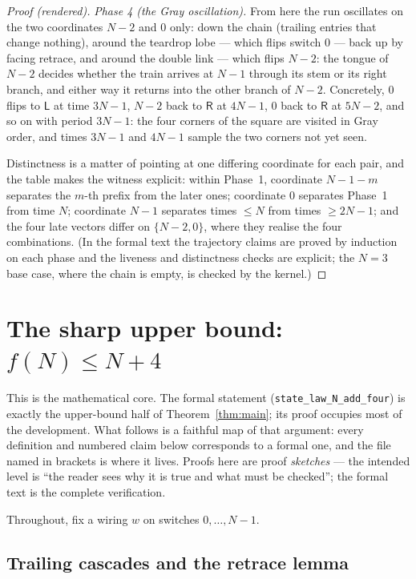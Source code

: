 \documentclass[11pt]{article}
\theoremstyle{definition}
\newcommand{\lean}[1]{\texttt{#1}}
\newcommand{\Left}{\mathsf{L}}
\newcommand{\Right}{\mathsf{R}}
\begin{document}
\begin{proof}[Proof (rendered)]
  \emph{Phase 4 (the Gray oscillation).}  From here the run oscillates
  on the two coordinates $N-2$ and $0$ only: down the chain (trailing
  entries that change nothing), around the teardrop lobe --- which
  flips switch $0$ --- back up by facing retrace, and around the double
  link --- which flips $N-2$: the tongue of $N-2$ decides whether the
  train arrives at $N-1$ through its stem or its right branch, and
  either way it returns into the other branch of $N-2$.  Concretely,
  $0$ flips to $\Left$ at time $3N-1$, $N-2$ back to $\Right$ at $4N-1$,
  $0$ back to $\Right$ at $5N-2$, and so on with period $3N-1$: the four
  corners of the square are visited in Gray order, and times $3N-1$ and
  $4N-1$ sample the two corners not yet seen.

  Distinctness is a matter of pointing at one differing coordinate for
  each pair, and the table makes the witness explicit: within Phase~1,
  coordinate $N-1-m$ separates the $m$-th prefix from the later ones;
  coordinate $0$ separates Phase~1 from time $N$; coordinate $N-1$
  separates times $\le N$ from times $\ge 2N-1$; and the four late
  vectors differ on $\{N-2, 0\}$, where they realise the four
  combinations.  (In the formal text the trajectory claims are proved by
  induction on each phase and the liveness and distinctness checks are
  explicit; the $N = 3$ base case, where the chain is empty, is checked
  by the kernel.)
\end{proof}

\section{The sharp upper bound: $f(N) \le N+4$}\label{sec:upper}

This is the mathematical core.  The formal statement
(\lean{state\_law\_N\_add\_four}) is exactly the upper-bound half of
Theorem~\ref{thm:main}; its proof occupies most of the development.
What follows is a faithful map of that argument: every definition and
numbered claim below corresponds to a formal one, and the file named in
brackets is where it lives.  Proofs here are proof \emph{sketches} ---
the intended level is ``the reader sees why it is true and what must be
checked''; the formal text is the complete verification.

Throughout, fix a wiring $w$ on switches $0,\dots,N-1$.

\subsection{Trailing cascades and the retrace lemma}\label{ssec:cascade}
\end{document}
